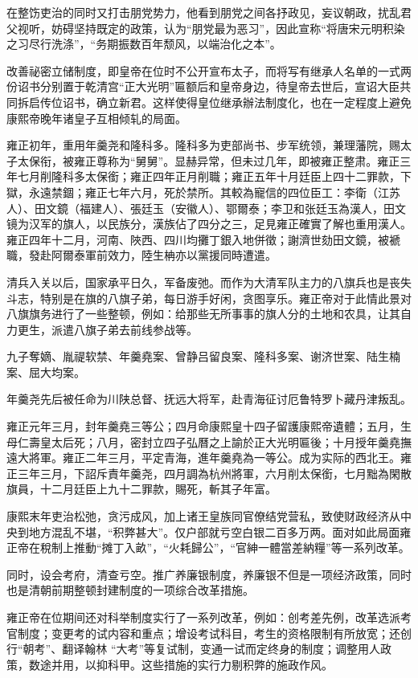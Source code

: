 在整饬吏治的同时又打击朋党势力，他看到朋党之间各抒政见，妄议朝政，扰乱君父视听，妨碍坚持既定的政策，认为“朋党最为恶习”，因此宣称“将唐宋元明积染之习尽行洗涤”，“务期振数百年颓风，以端治化之本”。

改善祕密立储制度，即皇帝在位时不公开宣布太子，而将写有继承人名单的一式两份诏书分别置于乾清宫“正大光明”匾额后和皇帝身边，待皇帝去世后，宣诏大臣共同拆启传位诏书，确立新君。这样使得皇位继承辦法制度化，也在一定程度上避免康熙帝晚年诸皇子互相倾轧的局面。

雍正初年，重用年羹尧和隆科多。隆科多为吏部尚书、步军统领，兼理藩院，赐太子太保衔，被雍正尊称为“舅舅”。显赫异常，但未过几年，即被雍正整肃。雍正三年七月削隆科多太保銜；雍正四年正月削職；雍正五年十月廷臣上四十二罪款，下獄，永遠禁錮；雍正七年六月，死於禁所。其較為寵信的四位臣工：李衛（江苏人）、田文鏡（福建人）、張廷玉（安徽人）、鄂爾泰；李卫和张廷玉為漢人，田文镜为汉军的旗人，以民族分，漢族佔了四分之三，足見雍正確實了解也重用漢人。雍正四年十二月，河南、陜西、四川均攤丁銀入地併徵；謝濟世劾田文鏡，被褫職，發赴阿爾泰軍前效力，陸生柟亦以黨援同時遭遣。

清兵入关以后，国家承平日久，军备废弛。而作为大清军队主力的八旗兵也是丧失斗志，特别是在旗的八旗子弟，每日游手好闲，贪图享乐。雍正帝对于此情此景对八旗旗务进行了一些整顿，例如：给那些无所事事的旗人分的土地和农具，让其自力更生，派遣八旗子弟去前线参战等。

九子奪嫡、胤禔软禁、年羹堯案、曾静吕留良案、隆科多案、谢济世案、陆生楠案、屈大均案。

年羹尧先后被任命为川陕总督、抚远大将军，赴青海征讨厄鲁特罗卜藏丹津叛乱。

雍正元年三月，封年羹堯三等公；四月命康熙皇十四子留護康熙帝遺體；五月，生母仁壽皇太后死；八月，密封立四子弘曆之上諭於正大光明匾後；十月授年羹堯撫遠大將軍。雍正二年三月，平定青海，進年羹堯為一等公。成为实际的西北王。雍正三年三月，下詔斥責年羹尧，四月調為杭州將軍，六月削太保銜，七月黜為閑散旗員，十二月廷臣上九十二罪款，賜死，斬其子年富。

康熙末年吏治松弛，贪污成风，加上诸王皇族同官僚结党营私，致使财政经济从中央到地方混乱不堪，“积弊甚大”。仅户部就亏空白银二百多万两。面对如此局面雍正帝在稅制上推動“摊丁入畝”，“火耗歸公”，“官紳一體當差納糧”等一系列改革。

同时，设会考府，清查亏空。推广养廉银制度，养廉银不但是一项经济政策，同时也是清朝前期整顿封建制度的一项综合改革措施。

雍正帝在位期间还对科举制度实行了一系列改革，例如：创考差先例，改革选派考官制度；变更考的试内容和重点；增设考试科目，考生的资格限制有所放宽；还创行“朝考”、翻译翰林 “大考”等复试制，变通一试而定终身的制度；调整用人政策，数途并用，以抑科甲。这些措施的实行力剔积弊的施政作风。

